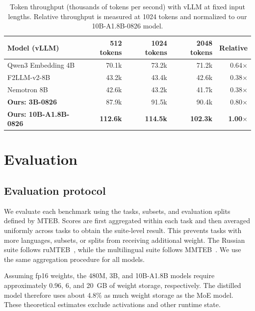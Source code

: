 \documentclass{article}
\begin{document}
\begin{table}[!t]
  \caption{Token throughput (thousands of tokens per second) with vLLM at fixed input lengths. Relative throughput is measured at 1024 tokens and normalized to our 10B-A1.8B-0826 model.}
  \label{tab:throughput}
  \centering
  \small
  \setlength{\tabcolsep}{5pt}
  \begin{tabular}{p{8.0cm}rrrr}
    \toprule
    \textbf{Model (vLLM)} & \textbf{512 tokens} & \textbf{1024 tokens} & \textbf{2048 tokens} & \textbf{Relative} \\
    \midrule
    Qwen3 Embedding 4B
      & 70.1k & 73.2k & 71.2k & 0.64$\times$ \\
    F2LLM-v2-8B
      & 43.2k & 43.4k & 42.6k & 0.38$\times$ \\
    Nemotron 8B
      & 42.6k & 43.2k & 41.7k & 0.38$\times$ \\
    \midrule
    \textbf{Ours: 3B-0826}
      & 87.9k & 91.5k & 90.4k & 0.80$\times$ \\
    \textbf{Ours: 10B-A1.8B-0826}
      & \textbf{112.6k} & \textbf{114.5k} & \textbf{102.3k} & \textbf{1.00$\times$} \\
    \bottomrule
  \end{tabular}
\end{table}

\section{Evaluation}
\label{sec:evaluation}

\subsection{Evaluation protocol}

We evaluate each benchmark using the tasks, subsets, and evaluation splits defined by MTEB.
Scores are first aggregated within each task and then averaged uniformly across tasks to obtain the suite-level result.
This prevents tasks with more languages, subsets, or splits from receiving additional weight.
The Russian suite follows ruMTEB~\citep{snegirev2025rumteb}, while the multilingual suite follows MMTEB~\citep{enevoldsen2025mmteb}.
We use the same aggregation procedure for all models.

Assuming fp16 weights, the 480M, 3B, and 10B-A1.8B models require approximately 0.96, 6, and 20~GB of weight storage, respectively.
The distilled model therefore uses about 4.8\% as much weight storage as the MoE model.
These theoretical estimates exclude activations and other runtime state.
\end{document}
